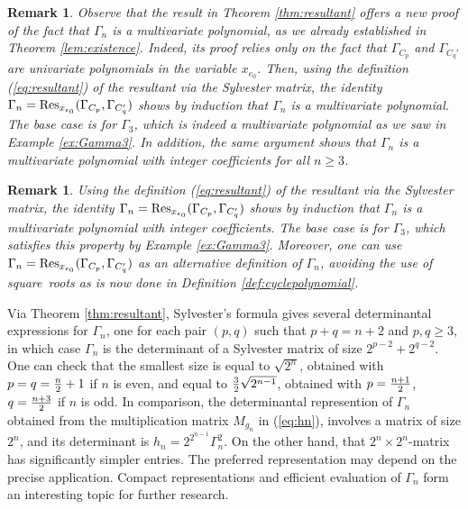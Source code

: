 \documentclass[a4paper, 11pt, twoside]{article}
\theoremstyle{plain}
\newtheorem{remark}[theorem]{Remark}
\begin{document}
\begin{remark}\label{rem:newproof}
Observe that the result in Theorem \ref{thm:resultant} offers a new proof of the fact that $\Gamma_n$ is a multivariate polynomial, as we already established in Theorem \ref{lem:existence}.
Indeed, its proof relies only on the fact that $\Gamma_{C_p}$ and $\Gamma_{C_q'}$ are {\em univariate polynomials} in the variable $x_{e_0}$. 
Then, using the definition (\ref{eq:resultant})  of the resultant via the Sylvester matrix, the identity $\Gamma_n=\text{\rm Res}_{x_{e_0}}(\Gamma_{C_p},\Gamma_{C'_q})$
shows by induction that $\Gamma_n$ is a {\em multivariate polynomial}. The base case is for $\Gamma_3$, which is indeed a multivariate polynomial as we saw in Example \ref{ex:Gamma3}. In addition, the same argument shows that $\Gamma_n$ is a multivariate polynomial with {\em integer coefficients} for all $n \geq 3$.
\end{remark}

\begin{remark} \label{rem:newproofnew}
Using the definition (\ref{eq:resultant})  of the resultant via the Sylvester matrix, the identity $\Gamma_n=\text{\rm Res}_{x_{e_0}}(\Gamma_{C_p},\Gamma_{C'_q})$
shows by induction that $\Gamma_n$ is a multivariate polynomial with \emph{integer coefficients}. The base case is for $\Gamma_3$, which satisfies this property by Example \ref{ex:Gamma3}. Moreover, one can use $\Gamma_n=\text{\rm Res}_{x_{e_0}}(\Gamma_{C_p},\Gamma_{C'_q})$ as an alternative \emph{definition} of $\Gamma_n$, avoiding the use of square~roots as is now done in Definition \ref{def:cyclepolynomial}. 
\end{remark}

Via Theorem \ref{thm:resultant}, Sylvester's formula gives several determinantal expressions for $\Gamma_n$, one for each pair $(p,q)$ such that $p+q=n+2$ and $p,q\ge 3$, in which case 
$\Gamma_n$ is the determinant of a Sylvester matrix of size
$2^{p-2}+2^{q-2}$.  
One can  check that the smallest size is equal to $\sqrt {2^n}$, obtained with $p=q={n\over 2}+1$ if $n$ is even, and equal to ${3\over 2}\sqrt {2^{n-1}}$, obtained with $p={n+1\over 2}$, $q={n+3\over 2}$  if $n$ is odd.
In comparison, the determinantal represention of $\Gamma_n$ obtained from the multiplication matrix $M_{g_n}$  in (\ref{eq:hn}), involves a matrix of size $2^n$, and its determinant is $h_n = 2^{2^{n-1}} \Gamma_n^2$. On the other hand, that $2^n \times 2^n$-matrix has significantly simpler entries. The preferred representation may depend on the precise application. Compact representations and efficient evaluation of $\Gamma_n$ form an interesting topic for further research. 
\end{document}
